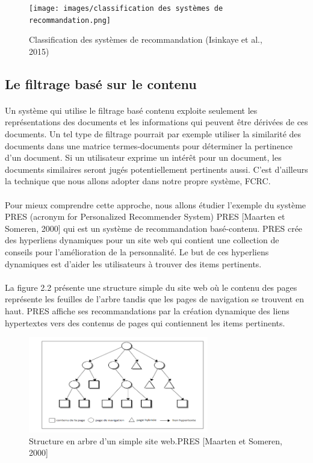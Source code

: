 \begin{figure}[h]
    \centering
    \texttt{[image: images/classification des systèmes de recommandation.png]}
    \caption{Classification des systèmes de recommandation (Isinkaye et al., 2015)}
    \label{fig:classification}
\end{figure}
\subsection{Le filtrage basé sur le contenu }
\paragraph{}
Un système qui utilise le filtrage basé contenu exploite seulement les représentations des
documents et les informations qui peuvent être dérivées de ces documents. Un tel type de filtrage
pourrait par exemple utiliser la similarité des documents dans une matrice termes-documents
pour déterminer la pertinence d’un document. Si un utilisateur exprime un intérêt pour un
document, les documents similaires seront jugés potentiellement pertinents aussi. C’est d’ailleurs
la technique que nous allons adopter dans notre propre système, FCRC.
\paragraph{}
Pour mieux comprendre cette approche, nous allons étudier l’exemple du système PRES
(acronym for Personalized Recommender System) PRES [Maarten et Someren, 2000] qui est un
système de recommandation basé-contenu. PRES crée des hyperliens dynamiques pour un site
web qui contient une collection de conseils pour l’amélioration de la personnalité. Le but de ces
hyperliens dynamiques est d’aider les utilisateurs à trouver des items pertinents.
\paragraph{}
La figure 2.2 présente une structure simple du site web où le contenu des pages représente les
feuilles de l'arbre tandis que les pages de navigation se trouvent en haut. PRES affiche ses
recommandations par la création dynamique des liens hypertextes vers des contenus de pages qui
contiennent les items pertinents.

\begin{figure}[h!]
    \centering
    \includegraphics[width=0.7\textwidth]{images/filtrage base sur contenu.PNG}
    \caption{Structure en arbre d’un simple site web.PRES [Maarten et Someren, 2000]}
    \label{fig:structure_site}
\end{figure}
